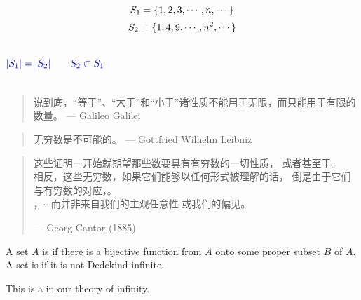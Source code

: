 \begin{frame}{}
  \[
    S_1 = \{1, 2, 3, \cdots, n, \cdots\}
  \]
  \[
    S_2 = \{1, 4, 9, \cdots, n^2, \cdots\}
  \]

  \begin{columns}
      \pause
      \[
	\textcolor{blue}{|S_1| = |S_2| \qquad S_2 \subset S_1}
      \]

      \pause
      \begin{center}
	{}
      \end{center}
      \pause
  \end{columns}

  \pause
  \vspace{0.80cm}
  \begin{quote}
    说到底，``等于''、``大于''和``小于''诸性质不能用于无限，而只能用于有限的数量。 \hfill --- Galileo Galilei
  \end{quote}

  \pause
  \vspace{0.20cm}
  \begin{quote}
    无穷数是不可能的。 \hfill --- Gottfried Wilhelm Leibniz
  \end{quote}
\end{frame}

\begin{frame}{}
  \begin{quote}
    这些证明一开始就期望那些数要具有有穷数的一切性质，
    或者甚至于。\\[15pt]

    相反，这些无穷数，如果它们能够以任何形式被理解的话，
    倒是由于它们与有穷数的对应，。\\[15pt]

    ，$\cdots$而并非来自我们的主观任意性
    或我们的偏见。

    \hfill --- Georg Cantor (1885)
  \end{quote}
\end{frame}

\begin{frame}{}
  \begin{definition}
    A set $A$ is 
    if there is a bijective function from $A$ onto some proper subset $B$ of $A$. \\[8pt]

    A set is  if it is not Dedekind-infinite.
  \end{definition}

  \pause

  \begin{center}
    This is a  in our theory of infinity.
  \end{center}
\end{frame}

\begin{frame}{}

  \begin{center}
  \end{center}
\end{frame}
